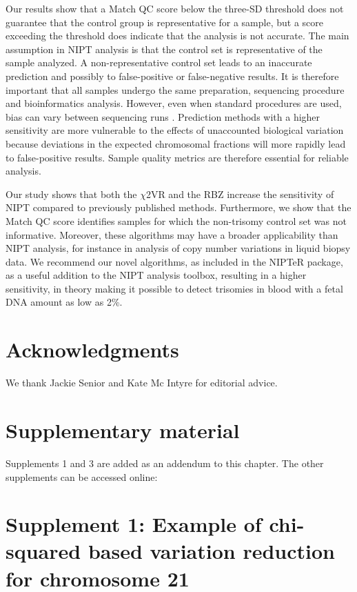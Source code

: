 Our results show that a Match QC score below the three-SD threshold does not guarantee that the control group is representative for a sample, but a score exceeding the threshold does indicate that the analysis is not accurate. 
The main assumption in NIPT analysis is that the control set is representative of the sample analyzed. 
A non-representative control set leads to an inaccurate prediction and possibly to false-positive or false-negative results. 
It is therefore important that all samples undergo the same preparation, sequencing procedure and bioinformatics analysis. 
However, even when standard procedures are used, bias can vary between sequencing runs \cite{Aird_2011}. 
Prediction methods with a higher sensitivity are more vulnerable to the effects of unaccounted biological variation because deviations in the expected chromosomal fractions will more rapidly lead to false-positive results. 
Sample quality metrics are therefore essential for reliable analysis.

Our study shows that both the $\chi$2VR and the RBZ increase the sensitivity of NIPT compared to previously published methods. 
Furthermore, we show that the Match QC score identifies samples for which the non-trisomy control set was not informative. 
Moreover, these algorithms may have a broader applicability than NIPT analysis, for instance in analysis of copy number variations in liquid biopsy data. 
We recommend our novel algorithms, as included in the NIPTeR package, as a useful addition to the NIPT analysis toolbox, resulting in a higher sensitivity, in theory making it possible to detect trisomies in blood with a fetal DNA amount as low as 2\%.

\section*{Acknowledgments}\label{Acknowledgments} 
We thank Jackie Senior and Kate Mc Intyre for editorial advice.

\section{Supplementary material}\label{Supplementary material}
Supplements 1 and 3 are added as an addendum to this chapter. 
The other supplements can be accessed online: 

\newpage
\section[Supplement 1: $\chi$2VR for chromosome 21]{Supplement 1: Example of chi-squared based variation reduction for chromosome 21}\label{Supplement 1}

